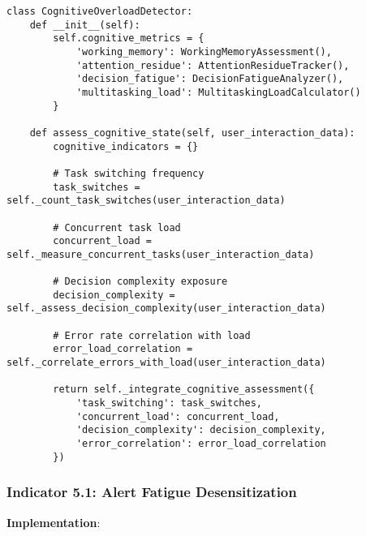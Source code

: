 \documentclass[11pt, onecolumn]{article}
\begin{document}
\begin{lstlisting}
class CognitiveOverloadDetector:
    def __init__(self):
        self.cognitive_metrics = {
            'working_memory': WorkingMemoryAssessment(),
            'attention_residue': AttentionResidueTracker(),
            'decision_fatigue': DecisionFatigueAnalyzer(),
            'multitasking_load': MultitaskingLoadCalculator()
        }
        
    def assess_cognitive_state(self, user_interaction_data):
        cognitive_indicators = {}
        
        # Task switching frequency
        task_switches = self._count_task_switches(user_interaction_data)
        
        # Concurrent task load
        concurrent_load = self._measure_concurrent_tasks(user_interaction_data)
        
        # Decision complexity exposure
        decision_complexity = self._assess_decision_complexity(user_interaction_data)
        
        # Error rate correlation with load
        error_load_correlation = self._correlate_errors_with_load(user_interaction_data)
        
        return self._integrate_cognitive_assessment({
            'task_switching': task_switches,
            'concurrent_load': concurrent_load,
            'decision_complexity': decision_complexity,
            'error_correlation': error_load_correlation
        })
\end{lstlisting}

\subsubsection{Indicator 5.1: Alert Fatigue Desensitization}

\textbf{Implementation}:
\end{document}
